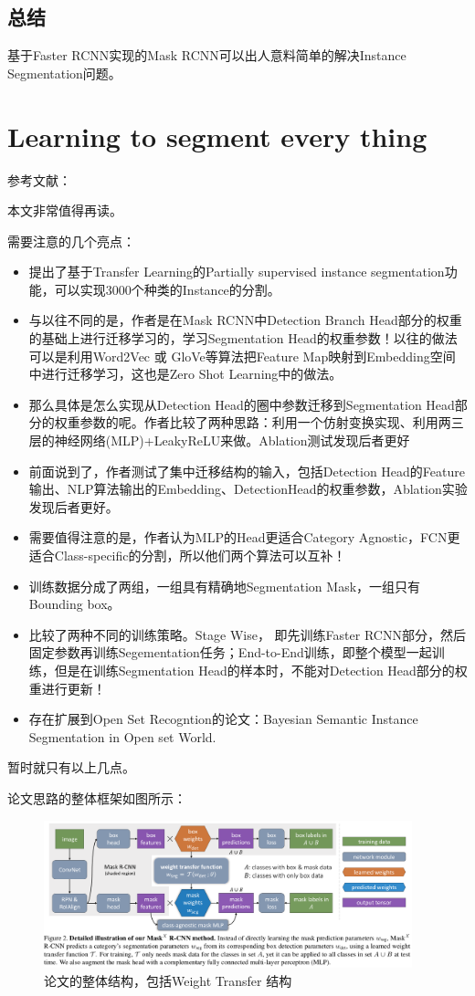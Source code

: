 \subsection{总结}

基于Faster RCNN实现的Mask RCNN可以出人意料简单的解决Instance Segmentation问题。

\section{Learning to segment every thing}

参考文献：\cite{hu2017learning}

本文非常值得再读。

需要注意的几个亮点：
\begin{itemize}
\item 提出了基于Transfer Learning的Partially supervised instance segmentation功能，可以实现3000个种类的Instance的分割。
\item 与以往不同的是，作者是在Mask RCNN中Detection Branch Head部分的权重的基础上进行迁移学习的，学习Segmentation Head的权重参数！以往的做法可以是利用Word2Vec 或 GloVe等算法把Feature Map映射到Embedding空间中进行迁移学习，这也是Zero Shot Learning中的做法。
\item 那么具体是怎么实现从Detection Head的圈中参数迁移到Segmentation Head部分的权重参数的呢。作者比较了两种思路：利用一个仿射变换实现、利用两三层的神经网络(MLP)+LeakyReLU来做。Ablation测试发现后者更好
\item 前面说到了，作者测试了集中迁移结构的输入，包括Detection Head的Feature 输出、NLP算法输出的Embedding、DetectionHead的权重参数，Ablation实验发现后者更好。
\item 需要值得注意的是，作者认为MLP的Head更适合Category Agnostic，FCN更适合Class-specific的分割，所以他们两个算法可以互补！
\item 训练数据分成了两组，一组具有精确地Segmentation Mask，一组只有Bounding box。
\item 比较了两种不同的训练策略。Stage Wise， 即先训练Faster RCNN部分，然后固定参数再训练Segementation任务；End-to-End训练，即整个模型一起训练，但是在训练Segmentation Head的样本时，不能对Detection Head部分的权重进行更新！
\item 存在扩展到Open Set Recogntion的论文：Bayesian Semantic Instance Segmentation in Open set World.
\end{itemize}

暂时就只有以上几点。

论文思路的整体框架如图所示：
\begin{figure}[!hbtp]
\centering
\includegraphics[width=0.95\textwidth]{SemanticSLAM/MaskXRCNN0.png}
\caption{论文的整体结构，包括Weight Transfer 结构}
\label{MaskXRCNN0}
\end{figure}

